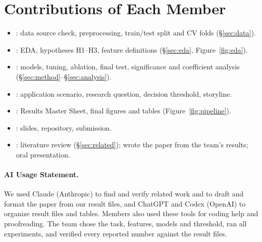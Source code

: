 \section*{Contributions of Each Member}
\begin{itemize}
  \item {}: data source check, preprocessing, train/test split and CV folds (\S\ref{sec:data}).
  \item {}: EDA, hypotheses H1--H3, feature definitions (\S\ref{sec:eda}, Figure~\ref{fig:eda}).
  \item {}: models, tuning, ablation, final test, significance and coefficient analysis (\S\ref{sec:method}--\S\ref{sec:analysis}).
  \item {}: application scenario, research question, decision threshold, storyline.
  \item {}: Results Master Sheet, final figures and tables (Figure~\ref{fig:pipeline}).
  \item {}: slides, repository, submission.
  \item {}: literature review (\S\ref{sec:related}); wrote the paper from the team's results; oral presentation.
\end{itemize}

\paragraph{AI Usage Statement.}
We used Claude (Anthropic) to find and verify related work and to draft and format the paper from our result files, and ChatGPT and Codex (OpenAI) to organize result files and tables.
Members also used these tools for coding help and proofreading.
The team chose the task, features, models and threshold, ran all experiments, and verified every reported number against the result files.
